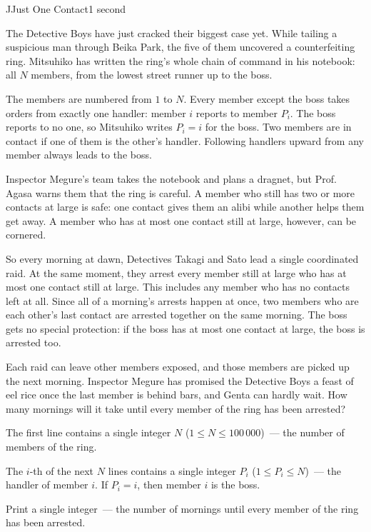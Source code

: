 \begin{problem}{J}{Just One Contact}{1 second}

\noindent
The Detective Boys have just cracked their biggest case yet. While tailing a suspicious man through Beika Park, the five of them uncovered a counterfeiting ring. Mitsuhiko has written the ring's whole chain of command in his notebook: all $N$ members, from the lowest street runner up to the boss.

\noindent
The members are numbered from $1$ to $N$. Every member except the boss takes orders from exactly one handler: member $i$ reports to member $P_i$. The boss reports to no one, so Mitsuhiko writes $P_i = i$ for the boss. Two members are in contact if one of them is the other's handler. Following handlers upward from any member always leads to the boss.

\noindent
Inspector Megure's team takes the notebook and plans a dragnet, but Prof. Agasa warns them that the ring is careful. A member who still has two or more contacts at large is safe: one contact gives them an alibi while another helps them get away. A member who has at most one contact still at large, however, can be cornered.

\noindent
So every morning at dawn, Detectives Takagi and Sato lead a single coordinated raid. At the same moment, they arrest every member still at large who has at most one contact still at large. This includes any member who has no contacts left at all. Since all of a morning's arrests happen at once, two members who are each other's last contact are arrested together on the same morning. The boss gets no special protection: if the boss has at most one contact at large, the boss is arrested too.

\noindent
Each raid can leave other members exposed, and those members are picked up the next morning. Inspector Megure has promised the Detective Boys a feast of eel rice once the last member is behind bars, and Genta can hardly wait. How many mornings will it take until every member of the ring has been arrested?

\InputFile

\noindent
The first line contains a single integer $N$ ($1 \le N \le 100\,000$)~--- the number of members of the ring.

\noindent
The $i$-th of the next $N$ lines contains a single integer $P_i$ ($1 \le P_i \le N$)~--- the handler of member $i$. If $P_i = i$, then member $i$ is the boss.

\OutputFile

\noindent
Print a single integer~--- the number of mornings until every member of the ring has been arrested.

\Examples

\begin{example}
\end{example}

\pagebreak

\end{problem}

